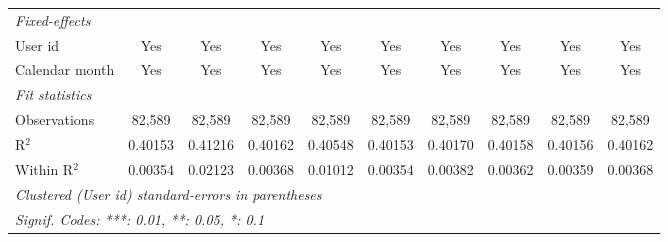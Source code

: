 \begin{table}[htbp]
\begin{footnotesize}
\begin{tabular}{lccccccccc}
         \midrule \emph{Fixed-effects} &   &   &   &   &   &   &   &   &  \\
         User id                     & Yes             & Yes             & Yes             & Yes             & Yes             & Yes             & Yes             & Yes             & Yes\\
         Calendar month              & Yes             & Yes             & Yes             & Yes             & Yes             & Yes             & Yes             & Yes             & Yes\\
         \midrule \emph{Fit statistics} &   &   &   &   &   &   &   &   &  \\
         Observations                & 82,589          & 82,589          & 82,589          & 82,589          & 82,589          & 82,589          & 82,589          & 82,589          & 82,589\\
         R$^2$                       & 0.40153         & 0.41216         & 0.40162         & 0.40548         & 0.40153         & 0.40170         & 0.40158         & 0.40156         & 0.40162\\
         Within R$^2$                & 0.00354         & 0.02123         & 0.00368         & 0.01012         & 0.00354         & 0.00382         & 0.00362         & 0.00359         & 0.00368\\
         \midrule\midrule\multicolumn{10}{l}{\emph{Clustered (User id) standard-errors in parentheses}}\\
         \multicolumn{10}{l}{\emph{Signif. Codes: ***: 0.01, **: 0.05, *: 0.1}}\\
      \end{tabular}
   \end{footnotesize}
\end{table}


